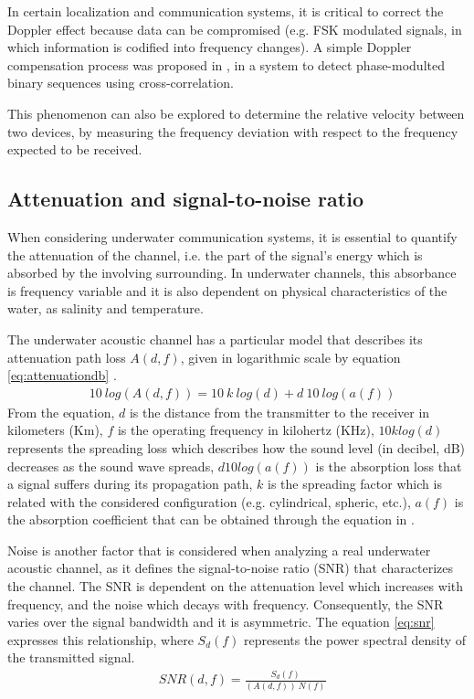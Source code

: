 In certain localization and communication systems, it is critical to correct the Doppler effect because data can be compromised (e.g. FSK modulated signals, in which information is codified into frequency changes). A simple Doppler compensation process  was proposed in \cite{thesis-joao}, in a system to detect phase-modulted binary sequences using cross-correlation.

This phenomenon can also be explored to determine the relative velocity between two devices, by measuring the frequency deviation with respect to the frequency expected to be received.


\subsection{Attenuation and signal-to-noise ratio} \label{subsec:snr}

When considering underwater communication systems, it is essential to quantify the attenuation of the channel, i.e. the part of the signal's energy which is absorbed by the involving surrounding. In underwater channels, this absorbance is frequency variable and it is also dependent on physical characteristics of the water, as salinity and temperature. 

The underwater acoustic channel has a particular model that describes its attenuation path loss \(A(d,f)\), given in logarithmic scale by equation \ref{eq:attenuationdb} \cite{pathloss}. 
\begin{eqnarray}
&10\ log(A(d,f)) = 10\ k\ log(d) + d\ 10\ log(a(f))
\label{eq:attenuationdb}
\end{eqnarray}
From the equation, \(d\) is the distance from the transmitter to the receiver in kilometers (Km), \(f\) is the operating frequency in kilohertz (KHz), \(10klog(d)\) represents the spreading loss which describes how the sound level (in decibel, dB) decreases as the sound wave spreads, \(d10log(a(f))\) is the absorption loss that a signal suffers during its propagation path, \(k\) is the spreading factor which is related with the considered configuration (e.g. cylindrical, spheric, etc.), \(a(f)\) is the absorption coefficient that can be obtained through the equation in \cite{pathloss}.

Noise is another factor that is considered when analyzing a real underwater acoustic channel, as it defines the signal-to-noise ratio (SNR) that characterizes the channel. The SNR is dependent on the attenuation level which increases with frequency, and the noise which decays with frequency. Consequently, the SNR varies over the signal bandwidth and it is asymmetric. The equation \ref{eq:snr} \cite{commchan} expresses this relationship, where \(S_{d}(f)\) represents the power spectral density of the transmitted signal.
\begin{eqnarray}
&SNR(d,f) = \frac{S_{d}(f)}{(A(d,f))\ N(f)}
\label{eq:snr}
\end{eqnarray}

